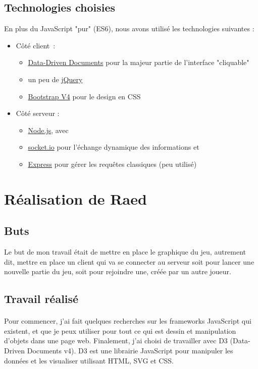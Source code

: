 \documentclass[a4paper, 11pt]{article}
\begin{document}
\subsection{Technologies choisies}
En plus du JavaScript "pur" (ES6), nous avons utilisé les technologies suivantes :
\begin{itemize}
	\item Côté client :
	\begin{itemize}
		\item \href{https://d3js.org/}{Data-Driven Documents} pour la majeur partie de l'interface "cliquable"
		\item un peu de \href{https://jquery.org/}{jQuery}
		\item \href{http://getbootstrap.com/}{Bootstrap V4} pour le design en CSS
	\end{itemize}
	\item Côté serveur :
	\begin{itemize}
		\item \href{https://nodejs.org/en/}{Node.js}, avec
		\item \href{https://socket.io/}{socket.io} pour l'échange dynamique des informations et
		\item \href{http://expressjs.com/}{Express} pour gérer les requêtes classiques (peu utilisé)
	\end{itemize}
\end{itemize}

\section{Réalisation de Raed}
\subsection{Buts}
Le but de mon travail était de mettre en place le graphique du jeu, autrement dit, mettre en place un client qui va se connecter au serveur
soit pour lancer une nouvelle partie du jeu, soit pour rejoindre une, créée par un autre joueur.

\subsection{Travail réalisé}
\paragraph{} Pour commencer, j'ai fait quelques recherches sur les frameworks JavaScript qui existent, et que je peux utiliser pour tout ce qui est dessin et manipulation d'objets dans une page web. Finalement, j'ai choisi de travailler avec D3 (Data-Driven Documents v4). D3 est 
une librairie JavaScript pour manipuler les données et les visualiser utilisant HTML, SVG et CSS.
\end{document}
